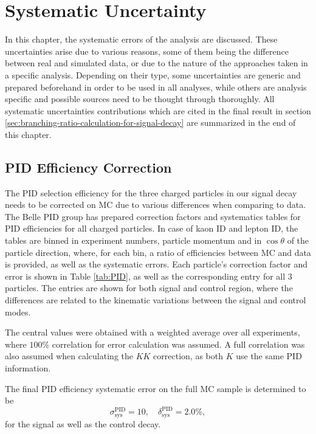 \chapter{Systematic Uncertainty}\label{sec:systematic-uncertainty}
In this chapter, the systematic errors of the analysis are discussed. These uncertainties arise due to various reasons, some of them being the difference between real and simulated data, or due to the nature of the approaches taken in a specific analysis. Depending on their type, some uncertainties are generic and prepared beforehand in order to be used in all analyses, while others are analysis specific and possible sources need to be thought through thoroughly. All systematic uncertainties contributions which are cited in the final result in section \ref{sec:branching-ratio-calculation-for-signal-decay} are summarized in the end of this chapter.

\section{PID Efficiency Correction}\label{sec:pid-efficiency-correction}

The PID selection efficiency for the three charged particles in our signal decay needs to be corrected on MC due to various differences when comparing to data. The Belle PID group has prepared correction factors and systematics tables for PID efficiencies for all charged particles. In case of kaon ID and lepton ID, the tables are binned in experiment numbers, particle momentum and in $\cos\theta$ of the particle direction, where, for each bin, a ratio of efficiencies between MC and data is provided, as well as the systematic errors. Each particle's correction factor and error is shown in Table \ref{tab:PID}, as well as the corresponding entry for all 3 particles. The entries are shown for both signal and control region, where the differences are related to the kinematic variations between the signal and control modes.

The central values were obtained with a weighted average over all experiments, where $100\%$ correlation for error calculation was assumed. A full correlation was also assumed when calculating the $KK$ correction, as both $K$ use the same PID information.

The final PID efficiency systematic error on the full MC sample is determined to be
\begin{equation}
\sigma_{\mathrm{sys}}^{\mathrm{PID}} = 10,\quad \delta_{\mathrm{sys}}^{\mathrm{PID}} = 2.0\%,
\end{equation}
for the signal as well as the control decay.


